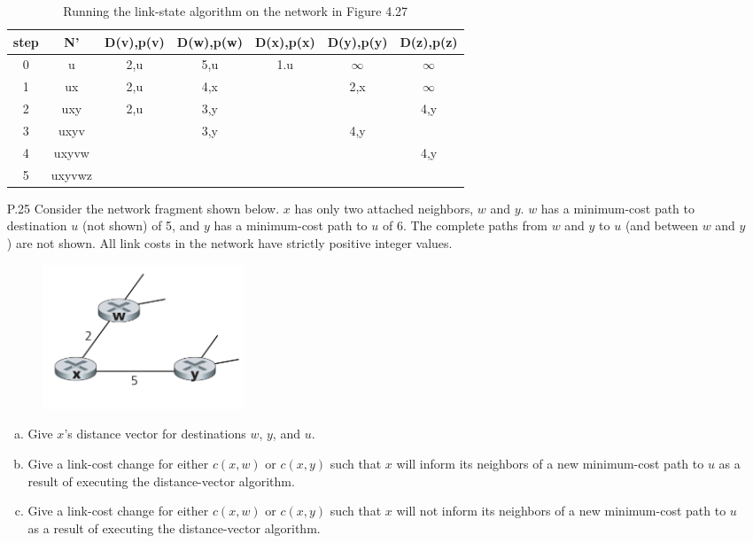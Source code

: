 \begin{enumerate}
	\begin{table}[H]
	    \centering
	    \begin{tabular}{ccccccc}
	        \hline
	        step & N' & D(v),p(v) & D(w),p(w) & D(x),p(x) & D(y),p(y) & D(z),p(z) \\
	        \hline
	        0 & u & 2,u & 5,u & 1.u & $\infty$ & $\infty$ \\
	        1 & ux & 2,u & 4,x & & 2,x & $\infty$ \\
	        2 & uxy & 2,u & 3,y & & & 4,y \\
	        3 & uxyv & & 3,y & & 4,y \\
	        4 & uxyvw & & & & & 4,y \\
	        5 & uxyvwz & & & & & \\
	        \hline
	    \end{tabular}
	    \caption{Running the link-state algorithm on the network in Figure 4.27}
	    \label{tab:4.3}
	\end{table}

	
	\item[P.25] Consider the network fragment shown below. $x$ has only two attached neighbors, $w$ and $y$. $w$ has a minimum-cost path to destination $u$ (not shown) of 5, and $y$ has a minimum-cost path to $u$ of 6. The complete paths from $w$ and $y$ to $u$ (and between $w$ and $y$) are not shown. All link costs in the network have strictly positive integer values.
	
    \begin{figure}[H]
        \centering
        \includegraphics[width=0.3\textwidth]{4/P25.png}
    \end{figure}
	
	\begin{enumerate}[a.]
	    \item Give $x$'s distance vector for destinations $w$, $y$, and $u$.
	    \item Give a link-cost change for either $c(x, w)$ or $c(x, y)$ such that $x$ will inform its neighbors of a new minimum-cost path to $u$ as a result of executing the distance-vector algorithm.
	    \item Give a link-cost change for either $c(x, w)$ or $c(x, y)$ such that $x$ will not inform its neighbors of a new minimum-cost path to $u$ as a result of executing the distance-vector algorithm.
	\end{enumerate}
	

\end{enumerate}
